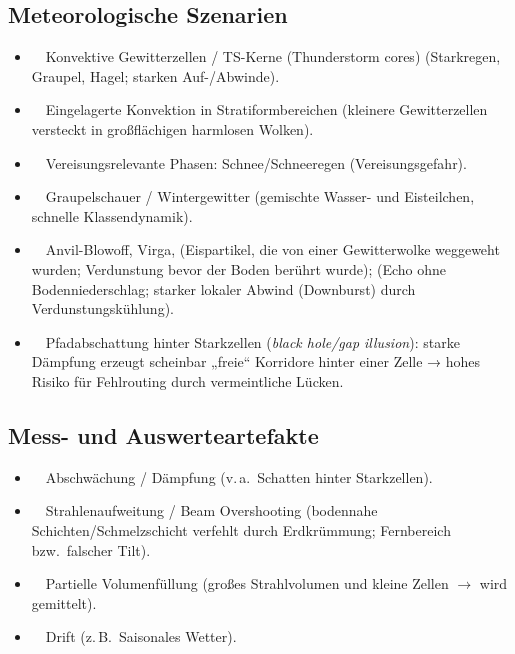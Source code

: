 \subsection*{Meteorologische Szenarien}
\begin{itemize}[leftmargin=2.2em,itemsep=0.35em]
  \item \riskhigh\ \scopeboth\ Konvektive Gewitterzellen / TS-Kerne (Thunderstorm cores) (Starkregen, Graupel, Hagel; starken Auf-/Abwinde).
  \item \riskhigh\ \scopeboth\ Eingelagerte Konvektion in Stratiformbereichen (kleinere Gewitterzellen versteckt in großflächigen harmlosen Wolken).
  \item \riskhigh\ \scopeboth\ Vereisungsrelevante Phasen: Schnee/Schneeregen (Vereisungsgefahr).
  \item \riskmed\ \scopeboth\ Graupelschauer / Wintergewitter (gemischte Wasser- und Eisteilchen, schnelle Klassendynamik).
  \item \riskmed\ \scopeboth\ Anvil-Blowoff, Virga, (Eispartikel, die von einer Gewitterwolke weggeweht wurden; Verdunstung bevor der Boden berührt wurde); (Echo ohne Bodenniederschlag; starker lokaler Abwind (Downburst) durch Verdunstungskühlung).
  \item \riskhigh\ \scopeon\ Pfadabschattung hinter Starkzellen (\emph{black hole/gap illusion}): starke Dämpfung erzeugt scheinbar „freie“ Korridore hinter einer Zelle → hohes Risiko für Fehlrouting durch vermeintliche Lücken.
\end{itemize}

\subsection*{Mess- und Auswerteartefakte}
\begin{itemize}[leftmargin=2.2em,itemsep=0.35em]
  \item \riskhigh\ \scopeboth\ Abschwächung / Dämpfung (v.\,a.\ Schatten hinter Starkzellen).
  \item \riskmed\ \scopeboth\ Strahlenaufweitung / Beam Overshooting (bodennahe Schichten/Schmelzschicht verfehlt durch Erdkrümmung; Fernbereich bzw.\ falscher Tilt).
  \item \riskmed\ \scopeboth\ Partielle Volumenfüllung (großes Strahlvolumen und kleine Zellen $\rightarrow$ wird gemittelt).
  \item \riskhigh\ \scopeapt\  Drift (z.\,B.\ Saisonales Wetter).
\end{itemize}

